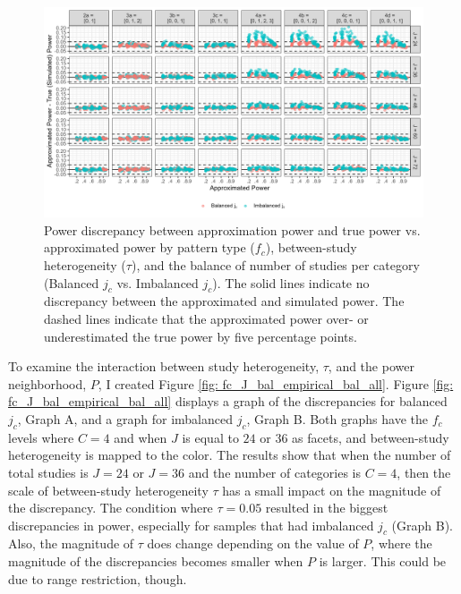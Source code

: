 \begin{figure}
    \centering\vspace{-5pt}\includegraphics[width=\linewidth]{chapters/plots/fc_J_bal_empirical.png}\caption{Power discrepancy between approximation power and true power vs. approximated power by pattern type ($f_c$), between-study heterogeneity ($\tau$), and the balance of number of studies per category (Balanced $j_c$ vs. Imbalanced $j_c$). The solid lines indicate no discrepancy between the approximated and simulated power. The dashed lines indicate that the approximated power over- or underestimated the true power by five percentage points.\label{fig: fc_J_bal_empirical}}
    \vspace{-5pt}
\end{figure}

To examine the interaction between study heterogeneity, $\tau$, and the power neighborhood, $P$, I created Figure \ref{fig: fc_J_bal_empirical_bal_all}.  Figure \ref{fig: fc_J_bal_empirical_bal_all} displays a graph of the discrepancies for balanced $j_c$, Graph A, and a graph for imbalanced $j_c$, Graph B. Both graphs have the $f_c$ levels where $C = 4$ and when $J$ is equal to $24$ or $36$ as facets, and between-study heterogeneity is mapped to the color. The results show that when the number of total studies is $J = 24$ or $J = 36$ and the number of categories is $C = 4$, then the scale of between-study heterogeneity $\tau$ has a small impact on the magnitude of the discrepancy. The condition where $\tau=0.05$ resulted in the biggest discrepancies in power, especially for samples that had imbalanced $j_c$ (Graph B). Also, the magnitude of $\tau$ does change depending on the value of $P$, where the magnitude of the discrepancies becomes smaller when $P$ is larger. This could be due to range restriction, though. 

